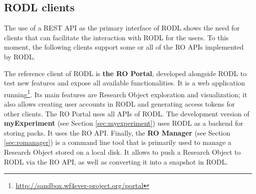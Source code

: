 \subsection{RODL clients}

The use of a REST API as the primary interface of RODL shows the need for clients that can facilitate the interaction with RODL for the users. To this moment, the following clients support some or all of the RO APIs implemented by RODL.

The reference client of RODL is \textbf{the RO Portal}, developed alongside RODL to test new features and expose all available functionalities. It is a web application running\footnote{\url{http://sandbox.wf4ever-project.org/portal}}. Its main features are Research Object exploration and visualization; it also allows creating user accounts in RODL and generating access tokens for other clients. The RO Portal uses all APIs of RODL. %
The development version of \textbf{myExperiment} (see Section \ref{sec:myexperiment}) %
 uses RODL as a backend for storing packs. It uses the RO API. Finally, the \textbf{RO Manager} (see Section \ref{sec:romanager}) %
is a command line tool that is primarily used to manage a Research Object stored on a local disk. It allows to push a Research Object to RODL via the RO API, as well as converting it into a snapshot in RODL.

